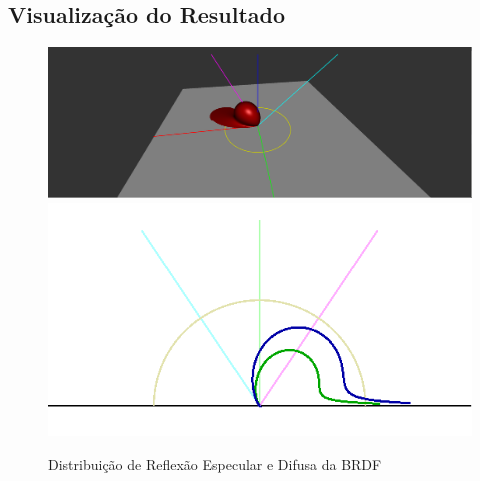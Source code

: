 \subsection{Visualização do Resultado}
\begin{figure}[H]
    \caption{\small{Distribuição de Reflexão Especular e Difusa da BRDF}}\label{fig-cook-torrance-alternative-eqlang}
    \vspace{42px}
  \includegraphics[width=\linewidth]{./Imagens/brdfs/cook-torrance-alternative-3D-plot}
\endminipage\hfill
{}
  \includegraphics[width=\linewidth]{./Imagens/brdfs/cook-torrance-alternative-polar-plot-log.png}
\endminipage\hfill
\end{figure}

